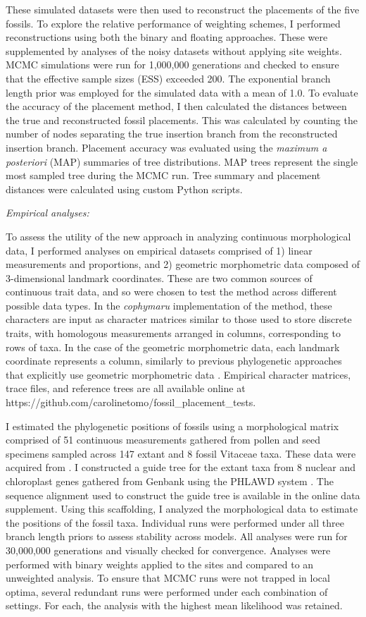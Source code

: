 \documentclass[12pt]{article}
\begin{document}
These simulated datasets were then used to reconstruct the placements of
the five fossils. To explore the relative performance of weighting
schemes, I performed reconstructions using both the binary and floating
approaches. These were supplemented by analyses of the noisy datasets
without applying site weights. MCMC simulations were run for 1,000,000
generations and checked to ensure that the effective sample sizes (ESS)
exceeded 200. The exponential branch length prior was employed for the
simulated data with a mean of 1.0. To evaluate the accuracy of the
placement method, I then calculated the distances between the true and
reconstructed fossil placements. This was calculated by counting the
number of nodes separating the true insertion branch from the
reconstructed insertion branch. Placement accuracy was evaluated using the
\emph{maximum a posteriori} (MAP) summaries of tree distributions. MAP
trees represent the single most sampled tree during the MCMC run.
Tree summary and placement distances
were calculated using custom Python scripts.

\noindent\emph{Empirical analyses:}

To assess the utility of the new approach in analyzing continuous 
morphological data, I performed analyses on empirical datasets 
comprised of 1)  linear measurements and proportions, and 2) 
geometric morphometric data composed of 3-dimensional landmark
coordinates. These are two common sources of continuous trait data,
and so were chosen to test the method across different possible data types.
In the \emph{cophymaru} implementation of the method, these characters
are input as character matrices similar to those used to store discrete traits, 
with homologous measurements arranged in columns, corresponding to rows of taxa.
In the case of the geometric morphometric data, each landmark coordinate represents a column, 
similarly to previous phylogenetic approaches that explicitly use geometric morphometric data \citep{catalano2010phylogenetic}.
Empirical character matrices, trace files, and reference trees are all available online at https://github.com/carolinetomo/fossil\_placement\_tests.

I estimated the phylogenetic positions of fossils using a morphological
matrix comprised of 51 continuous measurements gathered from pollen and
seed specimens sampled across 147 extant and 8 fossil Vitaceae taxa.
These data were acquired from \cite{chen2009history}. I constructed a guide tree
for the extant taxa from 8 nuclear and chloroplast genes gathered from
Genbank using the PHLAWD system \citep{soltis2011angiosperm}.
The sequence alignment used to construct the guide tree is available in
the online data supplement.
 Using this scaffolding, I analyzed the morphological data to estimate the positions of the fossil taxa.
Individual runs were performed under all three branch length priors to
assess stability across models. All analyses were run for 30,000,000
generations and visually checked for convergence. Analyses were
performed with binary weights applied to the sites and compared to an
unweighted analysis. To ensure that MCMC runs were not trapped in local
optima, several redundant runs were performed under each combination of settings.
For each, the analysis with the highest mean likelihood was retained.
\end{document}
